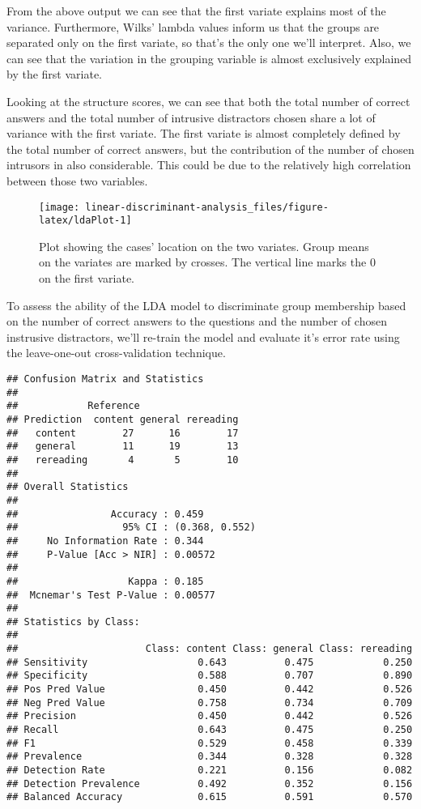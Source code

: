 \documentclass[11pt,]{article}
\begin{document}
From the above output we can see that the first variate explains most of
the variance. Furthermore, Wilks' lambda values inform us that the
groups are separated only on the first variate, so that's the only one
we'll interpret. Also, we can see that the variation in the grouping
variable is almost exclusively explained by the first variate.

Looking at the structure scores, we can see that both the total number
of correct answers and the total number of intrusive distractors chosen
share a lot of variance with the first variate. The first variate is
almost completely defined by the total number of correct answers, but
the contribution of the number of chosen intrusors in also considerable.
This could be due to the relatively high correlation between those two
variables.

\begin{figure*}
\texttt{[image: linear-discriminant-analysis\_files/figure-latex/ldaPlot-1]} \caption{\label{ldaPlot1}Plot showing the cases' location on the two variates. Group means on the variates are marked by crosses. The vertical line marks the 0 on the first variate.}\label{fig:ldaPlot}
\end{figure*}

To assess the ability of the LDA model to discriminate group membership
based on the number of correct answers to the questions and the number
of chosen instrusive distractors, we'll re-train the model and evaluate
it's error rate using the leave-one-out cross-validation technique.

\begin{verbatim}
## Confusion Matrix and Statistics
## 
##            Reference
## Prediction  content general rereading
##   content        27      16        17
##   general        11      19        13
##   rereading       4       5        10
## 
## Overall Statistics
##                                         
##                Accuracy : 0.459         
##                  95% CI : (0.368, 0.552)
##     No Information Rate : 0.344         
##     P-Value [Acc > NIR] : 0.00572       
##                                         
##                   Kappa : 0.185         
##  Mcnemar's Test P-Value : 0.00577       
## 
## Statistics by Class:
## 
##                      Class: content Class: general Class: rereading
## Sensitivity                   0.643          0.475            0.250
## Specificity                   0.588          0.707            0.890
## Pos Pred Value                0.450          0.442            0.526
## Neg Pred Value                0.758          0.734            0.709
## Precision                     0.450          0.442            0.526
## Recall                        0.643          0.475            0.250
## F1                            0.529          0.458            0.339
## Prevalence                    0.344          0.328            0.328
## Detection Rate                0.221          0.156            0.082
## Detection Prevalence          0.492          0.352            0.156
## Balanced Accuracy             0.615          0.591            0.570
\end{verbatim}
\end{document}
